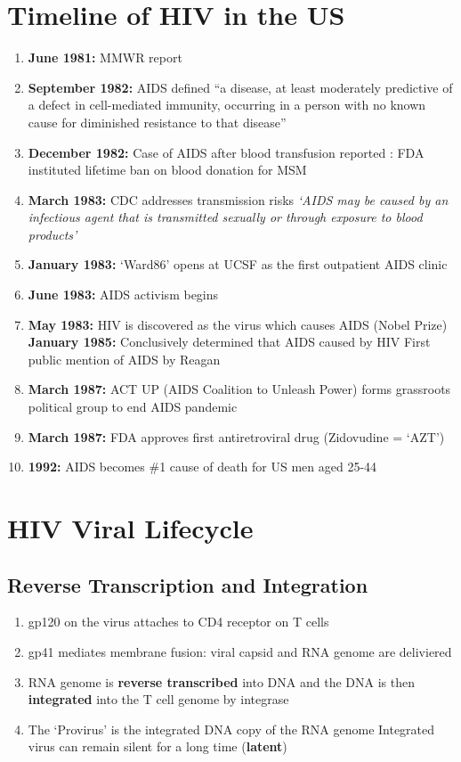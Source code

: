 \documentclass{notes}
\begin{document}
\section{Timeline of HIV in the US}

\begin{enumerate}
    \item \textbf{June 1981:} MMWR report
    \item \textbf{September 1982:} AIDS defined
    \subitem ``a disease, at least moderately predictive of a defect in cell-mediated immunity, occurring in a person with no known cause for diminished resistance to that disease''
    \item \textbf{December 1982:} Case of AIDS after blood transfusion reported
    : FDA instituted lifetime ban on blood donation for MSM
    \item \textbf{March 1983:} CDC addresses transmission risks
    \subitem \textit{`AIDS may be caused by an infectious agent that is transmitted sexually or through exposure to blood products'}
    \item \textbf{January 1983:} `Ward86' opens at UCSF as the first outpatient AIDS clinic
    \item \textbf{June 1983:} AIDS activism begins
    \item \textbf{May 1983:} HIV is discovered as the virus which causes AIDS (Nobel Prize)
    \subitem \textbf{January 1985:} Conclusively determined that AIDS caused by HIV
     First public mention of AIDS by Reagan
    \item \textbf{March 1987:} ACT UP (AIDS Coalition to Unleash Power) forms grassroots political group to end AIDS pandemic
    \item \textbf{March 1987:} FDA approves first antiretroviral drug (Zidovudine = `AZT')
    \item \textbf{1992:} AIDS becomes \#1 cause of death for US men aged 25-44
\end{enumerate}

\section{HIV Viral Lifecycle}

\subsection{Reverse Transcription and Integration}

\begin{enumerate}
    \item gp120 on the virus attaches to CD4 receptor on T cells
    \item gp41 mediates membrane fusion: viral capsid and RNA genome are deliviered
    \item RNA genome is \textbf{reverse transcribed} into DNA and the DNA is then \textbf{integrated} into the T cell genome by integrase
    \item The `Provirus' is the integrated DNA copy of the RNA genome
    \subitem Integrated virus can remain silent for a long time (\textbf{latent})
\end{enumerate}
\end{document}
